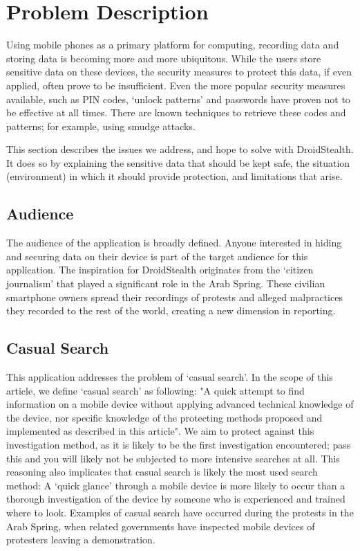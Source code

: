 \section{Problem Description}
\label{sec:problem-description}
Using mobile phones as a primary platform for computing, recording data and storing data is becoming more and more ubiquitous.
While the users store sensitive data on these devices, the security measures to protect this data, if even applied, often prove to be insufficient.
Even the more popular security measures available, such as PIN codes, `unlock patterns' and passwords have proven not to be effective at all times.
There are known techniques to retrieve these codes and patterns; for example, using smudge attacks\cite{aviv2010smudge}.

This section describes the issues we address, and hope to solve with DroidStealth.
It does so by explaining the sensitive data that should be kept safe, the situation (environment) in which it should provide protection, and limitations that arise.

\subsection{Audience}
The audience of the application is broadly defined.
Anyone interested in hiding and securing data on their device is part of the target audience for this application.
The inspiration for DroidStealth originates from the `citizen journalism'\cite{duffy2011} that played a significant role in the Arab Spring. 
These civilian smartphone owners spread their recordings of protests and alleged malpractices they recorded to the rest of the world, creating a new dimension in reporting.

\subsection{Casual Search}
This application addresses the problem of `casual search'.
In the scope of this article, we define `casual search' as following: 
"A quick attempt to find information on a mobile device without applying advanced technical knowledge of the device, nor specific knowledge of the protecting methods proposed and implemented as described in this article".
We aim to protect against this investigation method, as it is likely to be the first investigation encountered; pass this and you will likely not be subjected to more intensive searches at all.
This reasoning also implicates that casual search is likely the most used search method:
A `quick glance' through a mobile device is more likely to occur than a thorough investigation of the device by someone who is experienced and trained where to look.
Examples of casual search have occurred during the protests in the Arab Spring, when related governments have inspected mobile devices of protesters leaving a demonstration.

